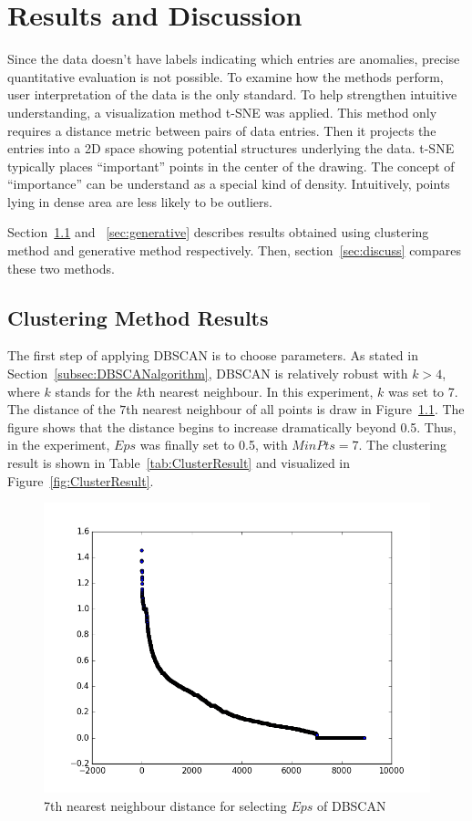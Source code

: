 \chapter{Results and Discussion}
\label{chapter:results}
Since the data doesn't have labels indicating which entries are anomalies, precise quantitative evaluation is not possible. To examine how the methods perform, user interpretation of the data is the only standard. To help strengthen intuitive understanding, a visualization method t-SNE\cite{maaten2008visualizing} was applied. This method only requires a distance metric between pairs of data entries. Then it projects the entries into a 2D space showing potential structures underlying the data. t-SNE typically places ``important'' points in the center of the drawing. The concept of ``importance'' can be understand as a special kind of density. Intuitively, points lying in dense area are less likely to be outliers.

Section~\ref{sec:clustering} and ~\ref{sec:generative} describes results obtained using clustering method and generative method respectively. Then, section~\ref{sec:discuss} compares these two methods.
\section{Clustering Method Results}
\label{sec:clustering}
The first step of applying DBSCAN is to choose parameters. As stated in Section~\ref{subsec:DBSCANalgorithm}, DBSCAN is relatively robust with $k > 4$, where $k$ stands for the $k$th nearest neighbour. In this experiment, $k$ was set to 7. The distance of the $7$th nearest neighbour of all points is draw in Figure~\ref{fig:paramDBSCAN}. The figure shows that the distance begins to increase dramatically beyond 0.5. Thus, in the experiment, $Eps$ was finally set to 0.5, with $MinPts = 7$. The clustering result is shown in Table~\ref{tab:ClusterResult} and visualized in Figure~\ref{fig:ClusterResult}.
\begin{figure}[!ht]
	\begin{center}
		\includegraphics[width=\textwidth]{images/paramDBSCAN}
		\caption{7th nearest neighbour distance for selecting $Eps$ of DBSCAN}
		\label{fig:paramDBSCAN}
	\end{center}
\end{figure}

